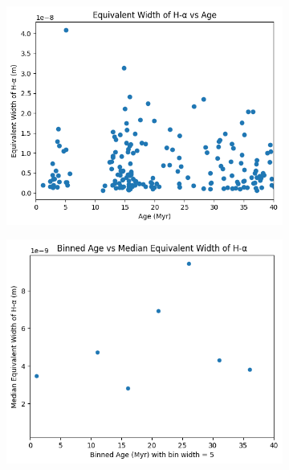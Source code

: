 \documentclass[12pt]{report}
\begin{document}
\begin{figure}[htbp]
    \begin{subfigure}{0.45\textwidth}
        \centering
        \includegraphics[width=\linewidth]{image23.png}
        \label{fig:image23}
    \end{subfigure}
    \hfill
    \begin{subfigure}{0.45\textwidth}
        \centering
        \includegraphics[width=\linewidth]{image25.png}
        \label{fig:image25}
    \end{subfigure}


\end{figure}
\end{document}
